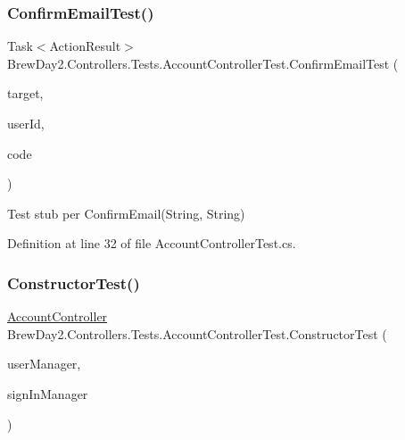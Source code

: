 \subsubsection{\texorpdfstring{Confirm\+Email\+Test()}{ConfirmEmailTest()}}
{\footnotesize\ttfamily Task$<$Action\+Result$>$ Brew\+Day2.\+Controllers.\+Tests.\+Account\+Controller\+Test.\+Confirm\+Email\+Test (\begin{DoxyParamCaption}\item[{\mbox{[}\+Pex\+Assume\+Under\+Test\mbox{]} \mbox{\hyperlink{class_brew_day2_1_1_controllers_1_1_account_controller}{Account\+Controller}}}]{target,  }\item[{string}]{user\+Id,  }\item[{string}]{code }\end{DoxyParamCaption})}



Test stub per Confirm\+Email(\+String, String)



Definition at line 32 of file Account\+Controller\+Test.\+cs.

\mbox{\label{class_brew_day2_1_1_controllers_1_1_tests_1_1_account_controller_test_a643ce681cea562f9fec8b9ce8beb3170}} 
\subsubsection{\texorpdfstring{Constructor\+Test()}{ConstructorTest()}}
{\footnotesize\ttfamily \mbox{\hyperlink{class_brew_day2_1_1_controllers_1_1_account_controller}{Account\+Controller}} Brew\+Day2.\+Controllers.\+Tests.\+Account\+Controller\+Test.\+Constructor\+Test (\begin{DoxyParamCaption}\item[{\mbox{\hyperlink{class_brew_day2_1_1_application_user_manager}{Application\+User\+Manager}}}]{user\+Manager,  }\item[{\mbox{\hyperlink{class_brew_day2_1_1_application_sign_in_manager}{Application\+Sign\+In\+Manager}}}]{sign\+In\+Manager }\end{DoxyParamCaption})}




